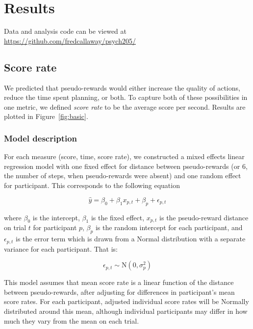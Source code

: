 \documentclass[10pt,letterpaper]{article}
\begin{document}
\section{Results}\label{results}

Data and analysis code can be viewed at \url{https://github.com/fredcallaway/psych205/}

\subsection{Score rate}
We predicted that pseudo-rewards would either increase the quality of actions, reduce the time spent planning, or both. To capture both of these possibilities in one metric, we defined \emph{score rate} to be the average score per second. Results are plotted in Figure~\ref{fig:basic}.

\subsubsection{Model description}
For each measure (score, time, score rate), we constructed a mixed effects linear regression model with one fixed effect for distance between pseudo-rewards (or 6, the number of steps, when pseudo-rewards were absent) and one random effect for participant. This corresponds to the following equation

\begin{equation}
    \hat{y} = \beta_0 + \beta_1 x_{p,t} + \beta_p + \epsilon_{p,t}
\end{equation}

where $\beta_0$ is the intercept, $\beta_1$ is the fixed effect, $x_{p,t}$ is the pseudo-reward distance on trial $t$ for participant $p$, $\beta_p$ is the random intercept for each participant, and $\epsilon_{p,t}$ is the error term which is drawn from a Normal distribution with a separate variance for each participant. That is:

\begin{equation}
    \epsilon_{p,t} \sim \text{N}(0, \sigma^2_p)
\end{equation}

This model assumes that mean score rate is a linear function of the distance between pseudo-rewards, after adjusting for differences in participant's mean score rates. For each participant, adjusted individual score rates will be Normally distributed around this mean, although individual participants may differ in how much they vary from the mean on each trial.
\end{document}
